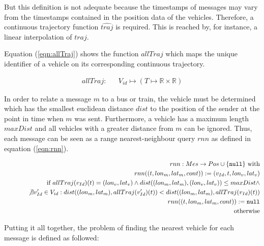 But this definition is not adequate because the timestamps of messages
may vary from the timestamps contained in the position data of the
vehicles. Therefore, a continuous trajectory function $\widehat{traj}$
is required. This is reached by, for instance, a linear interpolation
of $traj$.

Equation (\ref{eqn:allTraj}) shows the function $allTraj$ which maps
the unique identifier of a vehicle on its corresponding continuous
trajectory.

\vspace*{-2\baselineskip}
\begin{eqnarray}
 allTraj: & & V_{id} \mapsto (T \mapsto \mathbb{R} \times \mathbb{R})\label{eqn:allTraj}
\end{eqnarray}

In order to relate a message $m$ to a bus or train, the vehicle must
be determined which has the smallest euclidean distance $dist$ to the
position of the sender at the point in time when $m$ was
sent. Furthermore, a vehicle has a maximum length $maxDist$ and all
vehicles with a greater distance from $m$ can be ignored. Thus, each
message can be seen as a range nearest-neighbour query $rnn$ as
defined in equation (\ref{eqn:rnn}).

\vspace*{-2\baselineskip}
\begin{eqnarray}
  &&rnn: Mes \rightarrow Pos \cup \{\texttt{null}\} \textrm{ with}\label{eqn:rnn}\\
  &&rnn((t,lon_m,lat_m,cont)):= (v_{Id},t,lon_v,lat_v)\nonumber\\
  &&\hspace*{1cm}\textrm{if } allTraj(v_{Id})(t)=(lon_v,lat_v) \wedge dist((lon_m,lat_m),(lon_v,lat_v))\leq maxDist \wedge \nonumber\\
  &&\hspace*{1cm}\not\exists v_{Id}' \in V_{id}: dist((lon_m,lat_m),allTraj(v_{Id}')(t))< dist((lon_m,lat_m),allTraj(v_{Id})(t))\nonumber\\
  &&rnn((t,lon_m,lat_m,cont)):= \texttt{null}\nonumber\\
  &&\hspace*{1cm}\textrm{otherwise}\nonumber
\end{eqnarray}

Putting it all together, the problem of finding the nearest vehicle
for each message is defined as followed:

{
}

